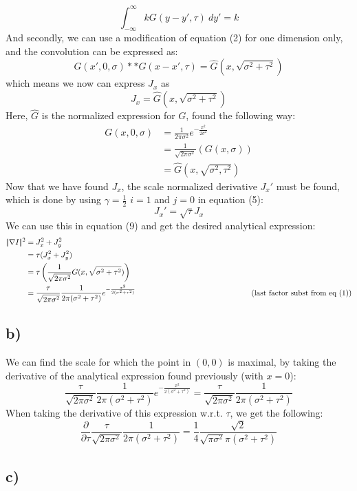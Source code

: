\documentclass[a4paper]{article}
\newcommand{\comment}[1]{%
  \text{\phantom{(#1)}} \tag{#1}}
\begin{document}
$$
  \int^{\infty}_{-\infty} k G(y-y',\tau)\:dy' = k
$$
And secondly, we can use a modification of equation (2) for one dimension only, and the convolution can be expressed as:
$$
  G(x',0,\sigma)**G(x-x',\tau) = \hat{G}(x,\sqrt{\sigma^2 + \tau^2})
$$
which means we now can express $J_x$ as
$$
  J_x = \hat{G}(x,\sqrt{\sigma^2 +\tau^2})
$$
Here, $\hat{G}$ is the normalized expression for $G$, found the following way:
\begin{align*}
  G(x,0,\sigma) &= \frac{1}{2\pi\sigma^2}e^{-\frac{x^2}{2\sigma^2} } \\
                &= \frac{1}{\sqrt{2\pi\sigma^2}} (G(x,\sigma))\\
                &= \hat{G}(x,\sqrt{\sigma^2, \tau^2})
\end{align*}
Now that we have found $J_x$, the scale normalized derivative $J_x'$ must be found, which is done by using $\gamma = \frac{1}{2} $ $i=1$ and $j=0$ in equation (5):
$$
J_x' = \sqrt{\tau}J_x
$$
We can use this in equation (9) and get the desired analytical expression:
\begin{align*}
  |\!| \nabla I |\!|^2 &= J_x^2 + J_y^2\\
                       &= \tau (J_x^2 + J_y^2)\\
                       &= \tau \left( \frac{1}{\sqrt{ 2\pi\sigma^2}}G(x,\sqrt{\sigma^2 + \tau^2})  \right)\\
                       &= \frac{\tau}{\sqrt{2\pi\sigma^2}} \frac{1}{2\pi(\sigma^2 + \tau^2)} e^{- \frac{x^2}{2(\sigma^2 + \tau^2)} } \comment{last factor subst from eq (1)}
\end{align*}
\subsection*{b)}
We can find the scale for which the point in $(0,0)$ is maximal, by taking the derivative of the analytical expression found previously (with $x=0$):
$$
\frac{\tau}{\sqrt{2\pi\sigma^2}} \frac{1}{2\pi(\sigma^2 + \tau^2)} e^{- \frac{x^2}{2(\sigma^2 + \tau^2)} } = \frac{\tau}{\sqrt{2\pi\sigma^2}} \frac{1}{2\pi(\sigma^2 + \tau^2)}
$$
When taking the derivative of this expression w.r.t. $\tau$, we get the following:
$$
  \frac{\partial}{\partial \tau} \frac{\tau}{\sqrt{2\pi\sigma^2}} \frac{1}{2\pi(\sigma^2 + \tau^2)} = \frac{1}{4} \frac{\sqrt{2}}{\sqrt{\pi\sigma^2} \pi(\sigma^2 + \tau^2)}
$$
\subsection*{c)}
\end{document}
